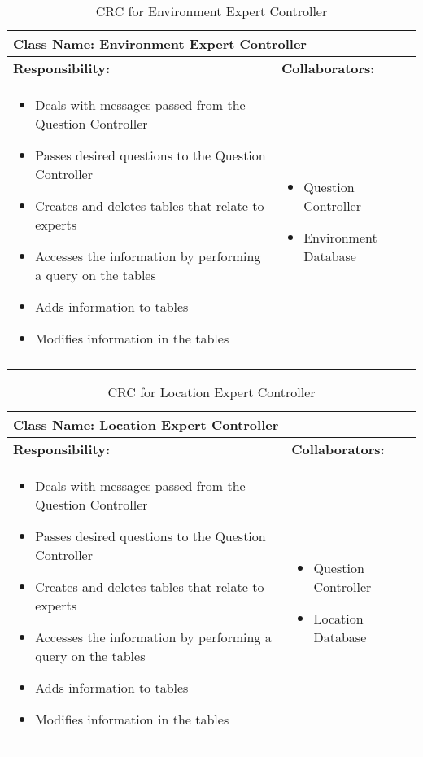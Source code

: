 \documentclass[titlepage]{article}
\begin{document}
	
	\begin{longtable}{| p{} | p{} |}
			\hline
			 \multicolumn{2}{|l|}{\textbf{Class Name: Environment Expert Controller}} \\
			\hline
			\textbf{Responsibility:} & \textbf{Collaborators:} \\
			\hline
				\begin{itemize}
					\item Deals with messages passed from the Question Controller
					\item Passes desired questions to the Question Controller
					\item Creates and deletes tables that relate to experts
					\item Accesses the information by performing a query on the tables
					\item Adds information to tables
					\item Modifies information in the tables
				\end{itemize} & 
				\begin{itemize}
					\item Question Controller
					\item Environment Database
				\end{itemize} 
				\\
			\hline
		\caption{CRC for Environment Expert Controller}
	\end{longtable}
	
	
	\begin{longtable}{| p{} | p{} |}
			\hline
			 \multicolumn{2}{|l|}{\textbf{Class Name: Location Expert Controller}} \\
			\hline
			\textbf{Responsibility:} & \textbf{Collaborators:} \\
			\hline
				\begin{itemize}
					\item Deals with messages passed from the Question Controller
					\item Passes desired questions to the Question Controller
					\item Creates and deletes tables that relate to experts
					\item Accesses the information by performing a query on the tables
					\item Adds information to tables
					\item Modifies information in the tables
				\end{itemize} & 
				\begin{itemize}
					\item Question Controller
					\item Location Database
				\end{itemize} 
				\\
			\hline
		\caption{CRC for Location Expert Controller}
	\end{longtable}
	
\end{document}
